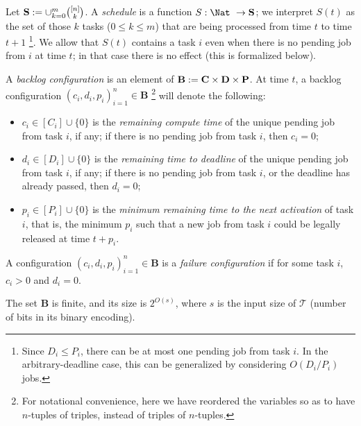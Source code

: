 \documentclass{llncs}
\newcommand{\tsys}{\ensuremath{\mathcal{T}}}
\newcommand{\sched}{\ensuremath{S}}
\newcommand{\backlog}{\ensuremath{\mathbf{B}}}
\begin{document}
Let $\mathbf{S}:=\cup_{k=0}^m \binom{[n]}{k}$. A \emph{schedule} is a function $\sched: \Nat\ \to \scheddec$; we interpret $\sched(t)$ as the set of those $k$ tasks ($0 \le k \le m$) that are being processed from time $t$ to time $t+1$ \footnote{Since $D_i \le P_i$, there can be at most one pending job from task $i$. In the arbitrary-deadline case, this can be generalized by considering $O(D_i/P_i)$ jobs.}. We allow that $\sched(t)$ contains a task $i$ even when there is no pending job from $i$ at time $t$; in that case there is no effect (this is formalized below). 

A \emph{backlog configuration} is an element of $\backlog := \rct \times \ttd \times \tta$. 
At time $t$, a backlog configuration $(c_i,d_i,p_i)_{i=1}^n \in \backlog$ \footnote{For notational convenience, here we have reordered the variables so as to have $n$-tuples of triples, instead of triples of $n$-tuples.} will denote the following: 
\begin{itemize}
\item $c_i \in [C_i] \cup \{0\}$ is the \emph{remaining compute time} of the unique pending job from task $i$, if any; if there is no pending job from task $i$, then $c_i=0$; 
\item $d_i \in [D_i] \cup \{0\}$ is the \emph{remaining time to deadline} of the unique pending job from task $i$, if any; if there is no pending job from task $i$, or the deadline has already passed, then $d_i=0$; 
\item $p_i \in [P_i] \cup \{0\}$ is the \emph{minimum remaining time to the next activation} of task $i$, that is, the minimum $p_i$ such that a new job from task $i$ could be legally released at time $t+p_i$. 
\end{itemize}
A configuration $(c_i,d_i,p_i)_{i=1}^n \in \backlog$ is a \emph{failure configuration} if for some task $i$, $c_i > 0$ and $d_i = 0$.  
\begin{remark}
\label{rmk:state-size}
The set $\backlog$ is finite, and its size is $2^{O(s)}$, where $s$ is the input size of $\tsys$ (number of bits in its binary encoding). 
\end{remark}
\end{document}
